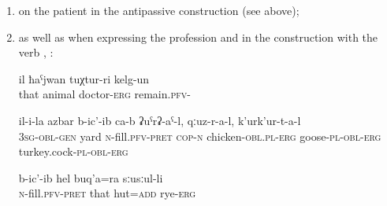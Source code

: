 \begin{enumerate}
	\item	on the patient in the antipassive construction (see  above);

	\item	as well as when expressing the profession  and in the construction with the verb  , :
	\begin{exe}
			\ex	\label{ex:He was the veterinarian}
		\gll	il	ħaˁjwan	tuχtur-ri	kelg-un\\
			that	animal	doctor-\textsc{erg}	remain.\textsc{pfv}-\\
		\glt	{}
		
		\ex
		\begin{xlist}
			\ex	\label{ex:His yard was filled with chickens, turkeys, and geese}
			\gll	 il-i-la		azbar	b-ic'-ib ca-b	ʡuˁrʡ-aˁ-l,	qːuz-r-a-l,	k'urk'ur-t-a-l\\
				3\textsc{sg}-\textsc{obl}-\textsc{gen}	yard	\textsc{n}-fill.\textsc{pfv}-\textsc{pret} \textsc{cop-n}	chicken-\textsc{obl}.\textsc{pl}-\textsc{erg}	goose-\textsc{pl}-\textsc{obl}-\textsc{erg} turkey.cock-\textsc{pl}-\textsc{obl}-\textsc{erg}\\
			\glt	{}
	
			\ex	\label{ex:And they also filled the hut with rye}
			\gll	b-ic'-ib	hel	buq'a=ra	sːusːul-li\\
				\textsc{n}-fill.\textsc{pfv}-\textsc{pret}	that	hut=\textsc{add}	rye-\textsc{erg}\\
			\glt	{}
		\end{xlist}
		
	\end{exe}
\end{enumerate}



